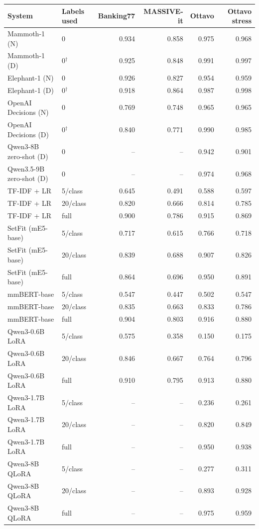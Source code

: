 \begin{tabular}{llrrrr}
\toprule
System & Labels used & Banking77 & MASSIVE-it & Ottavo & Ottavo stress \\
\midrule
Mammoth-1 (N) & 0 & 0.934 & 0.858 & 0.975 & 0.968 \\
Mammoth-1 (D) & 0$^\dagger$ & 0.925 & 0.848 & 0.991 & 0.997 \\
Elephant-1 (N) & 0 & 0.926 & 0.827 & 0.954 & 0.959 \\
Elephant-1 (D) & 0$^\dagger$ & 0.918 & 0.864 & 0.987 & 0.998 \\
OpenAI Decisions (N) & 0 & 0.769 & 0.748 & 0.965 & 0.965 \\
OpenAI Decisions (D) & 0$^\dagger$ & 0.840 & 0.771 & 0.990 & 0.985 \\
Qwen3-8B zero-shot (D) & 0 & -- & -- & 0.942 & 0.901 \\
Qwen3.5-9B zero-shot (D) & 0 & -- & -- & 0.974 & 0.968 \\
\midrule
TF-IDF + LR & 5/class & 0.645 & 0.491 & 0.588 & 0.597 \\
TF-IDF + LR & 20/class & 0.820 & 0.666 & 0.814 & 0.785 \\
TF-IDF + LR & full & 0.900 & 0.786 & 0.915 & 0.869 \\
SetFit (mE5-base) & 5/class & 0.717 & 0.615 & 0.766 & 0.718 \\
SetFit (mE5-base) & 20/class & 0.839 & 0.688 & 0.907 & 0.826 \\
SetFit (mE5-base) & full & 0.864 & 0.696 & 0.950 & 0.891 \\
mmBERT-base & 5/class & 0.547 & 0.447 & 0.502 & 0.547 \\
mmBERT-base & 20/class & 0.835 & 0.663 & 0.833 & 0.786 \\
mmBERT-base & full & 0.904 & 0.803 & 0.916 & 0.880 \\
Qwen3-0.6B LoRA & 5/class & 0.575 & 0.358 & 0.150 & 0.175 \\
Qwen3-0.6B LoRA & 20/class & 0.846 & 0.667 & 0.764 & 0.796 \\
Qwen3-0.6B LoRA & full & 0.910 & 0.795 & 0.913 & 0.880 \\
Qwen3-1.7B LoRA & 5/class & -- & -- & 0.236 & 0.261 \\
Qwen3-1.7B LoRA & 20/class & -- & -- & 0.820 & 0.849 \\
Qwen3-1.7B LoRA & full & -- & -- & 0.950 & 0.938 \\
Qwen3-8B QLoRA & 5/class & -- & -- & 0.277 & 0.311 \\
Qwen3-8B QLoRA & 20/class & -- & -- & 0.893 & 0.928 \\
Qwen3-8B QLoRA & full & -- & -- & 0.975 & 0.959 \\
\bottomrule
\end{tabular}